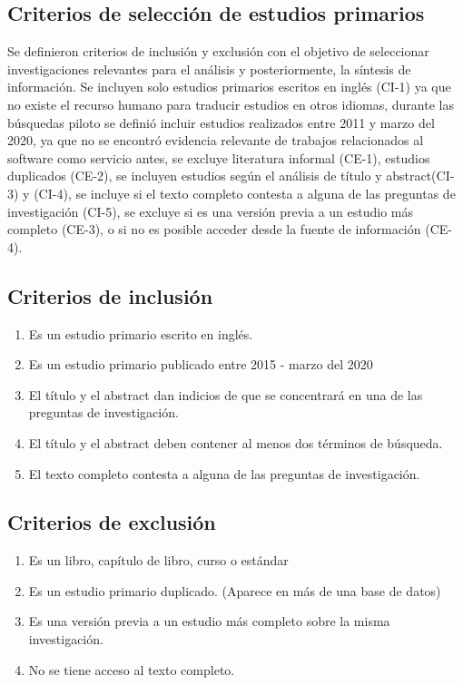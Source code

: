 \documentclass{article}
\begin{document}
\subsection{Criterios de selección de estudios primarios}
Se definieron criterios de inclusión y exclusión con el objetivo 
de seleccionar investigaciones relevantes para el análisis y posteriormente, 
la síntesis de información.
Se incluyen solo estudios primarios escritos en inglés (CI-1) ya que no existe el
recurso humano para traducir estudios en otros idiomas, durante las búsquedas piloto 
se definió incluir estudios realizados entre 2011 y marzo del 2020, ya que no se encontró evidencia 
relevante de trabajos relacionados al software como servicio antes, se excluye literatura informal (CE-1),
estudios duplicados (CE-2), se incluyen estudios según el análisis de título y abstract(CI-3) y (CI-4),
se incluye si el texto completo contesta a alguna de las preguntas de investigación (CI-5), 
se excluye si es una versión previa a un estudio más completo (CE-3), o si no es posible acceder desde la fuente 
de información (CE-4).


\subsection{Criterios de inclusión}
\begin{enumerate}[C-1.-]
  \item{Es un estudio primario escrito en inglés.}
  \item{Es un estudio primario publicado entre 2015 - marzo del 2020}
  \item{El título y el abstract dan indicios de que se concentrará en una de las preguntas de investigación.}
  \item{El título y el abstract deben contener al menos dos términos de búsqueda.}
  \item{El texto completo contesta a alguna de las preguntas de investigación.}
\end{enumerate}

\subsection{Criterios de exclusión}
\begin{enumerate}[CE-1.-]
  \item{Es un libro, capítulo de libro, curso o estándar}
  \item{Es un estudio primario duplicado. (Aparece en más de una base de datos)}
  \item{Es una versión previa a un estudio más completo sobre la misma investigación.}
  \item{No se tiene acceso al texto completo.}
\end{enumerate}
\newpage
\end{document}
